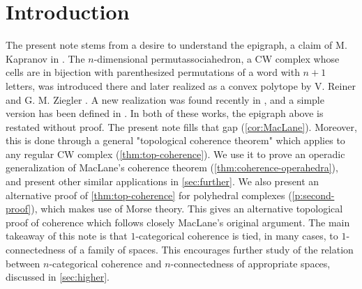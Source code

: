 
\section*{Introduction} 
\label{s:introduction}

The present note stems from a desire to understand the epigraph, a claim of M. Kapranov in \cite{kapranov1993}. 
The $n$-dimensional permutassociahedron, a CW complex whose cells are in bijection with parenthesized permutations of a word with $n+1$ letters, was introduced there and later realized as a convex polytope by V. Reiner and G. M. Ziegler \cite{reinerCoxeterassociahedra1994}. 
A new realization was found recently in \cite{CastilloLiu21}, and a simple version has been defined in \cite{baralicSimplePermutoassociahedron2019}.
In both of these works, the epigraph above is restated without proof. 
The present note fills that gap (\cref{cor:MacLane}).
Moreover, this is done through a general "topological coherence theorem" which applies to any regular CW complex (\cref{thm:top-coherence}).
We use it to prove an operadic generalization of MacLane's coherence theorem (\cref{thm:coherence-operahedra}), and present other similar applications in \cref{sec:further}. 
We also present an alternative proof of \cref{thm:top-coherence} for polyhedral complexes (\cref{p:second-proof}), which makes use of Morse theory. 
This gives an alternative topological proof of coherence which follows closely MacLane's original argument. 
The main takeaway of this note is that $1$-categorical coherence is tied, in many cases, to $1$-connectedness of a family of spaces. 
This encourages further study of the relation between $n$-categorical coherence and $n$-connectedness of appropriate spaces, discussed in \cref{sec:higher}.



